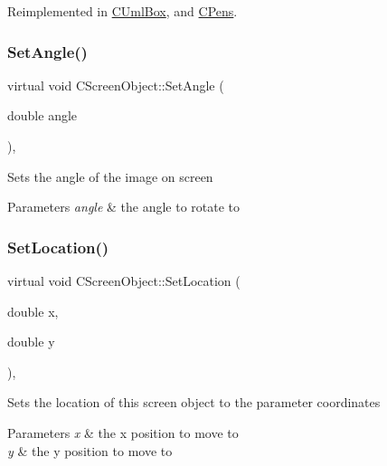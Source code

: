 Reimplemented in \mbox{\hyperlink{class_c_uml_box_a49ddda6a0bbd7b224b743f83b2f7cb0c}{C\+Uml\+Box}}, and \mbox{\hyperlink{class_c_pens_ac7f21709db467d9cb2c30f814d391edf}{C\+Pens}}.

\mbox{\label{class_c_screen_object_a3be2f2dc3917c25dc208217cb3acc72c}} 
\subsubsection{\texorpdfstring{SetAngle()}{SetAngle()}}
{\footnotesize\ttfamily virtual void C\+Screen\+Object\+::\+Set\+Angle (\begin{DoxyParamCaption}\item[{double}]{angle }\end{DoxyParamCaption})\hspace{0.3cm}{\ttfamily [inline]}, {\ttfamily [virtual]}}

Sets the angle of the image on screen 
\begin{DoxyParams}{Parameters}
{\em angle} & the angle to rotate to \\
\hline
\end{DoxyParams}
\mbox{\label{class_c_screen_object_abf7223b82f96a94c74952ddabf1fed5e}} 
\subsubsection{\texorpdfstring{SetLocation()}{SetLocation()}}
{\footnotesize\ttfamily virtual void C\+Screen\+Object\+::\+Set\+Location (\begin{DoxyParamCaption}\item[{double}]{x,  }\item[{double}]{y }\end{DoxyParamCaption})\hspace{0.3cm}{\ttfamily [inline]}, {\ttfamily [virtual]}}

Sets the location of this screen object to the parameter coordinates 
\begin{DoxyParams}{Parameters}
{\em x} & the x position to move to \\
\hline
{\em y} & the y position to move to \\
\hline
\end{DoxyParams}
\mbox{\label{class_c_screen_object_ab682c1e08f001e666f0cec280e1e9eaa}} 
